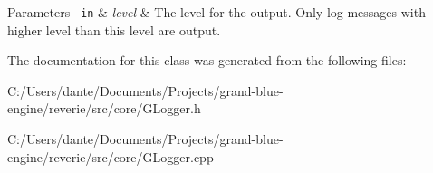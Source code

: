 \begin{DoxyParams}[1]{Parameters}
\mbox{\texttt{ in}}  & {\em level} & The level for the output. Only log messages with higher level than this level are output. \\
\hline
\end{DoxyParams}


The documentation for this class was generated from the following files\+:\begin{DoxyCompactItemize}
\item 
C\+:/\+Users/dante/\+Documents/\+Projects/grand-\/blue-\/engine/reverie/src/core/G\+Logger.\+h\item 
C\+:/\+Users/dante/\+Documents/\+Projects/grand-\/blue-\/engine/reverie/src/core/G\+Logger.\+cpp\end{DoxyCompactItemize}
